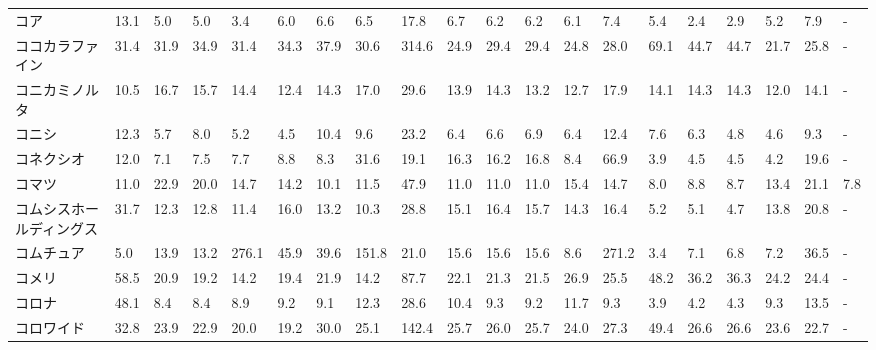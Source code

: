 \begin{longtable}[c]{lp{3mm}p{3mm}p{3mm}p{3mm}p{3mm}p{3mm}p{3mm}p{3mm}p{3mm}p{3mm}p{3mm}p{3mm}p{3mm}p{3mm}p{3mm}p{3mm}p{3mm}p{3mm}p{3mm}}
コア              &   13.1 &    5.0 &       5.0 &       3.4 &        6.0 &     6.6 &     6.5 &     17.8 &     6.7 &     6.2 &    6.2 &    6.1 &     7.4 &     5.4 &     2.4 &    2.9 &    5.2 &     7.9 &      - \\
ココカラファイン        &   31.4 &   31.9 &      34.9 &      31.4 &       34.3 &    37.9 &    30.6 &    314.6 &    24.9 &    29.4 &   29.4 &   24.8 &    28.0 &    69.1 &    44.7 &   44.7 &   21.7 &    25.8 &      - \\
コニカミノルタ         &   10.5 &   16.7 &      15.7 &      14.4 &       12.4 &    14.3 &    17.0 &     29.6 &    13.9 &    14.3 &   13.2 &   12.7 &    17.9 &    14.1 &    14.3 &   14.3 &   12.0 &    14.1 &      - \\
コニシ             &   12.3 &    5.7 &       8.0 &       5.2 &        4.5 &    10.4 &     9.6 &     23.2 &     6.4 &     6.6 &    6.9 &    6.4 &    12.4 &     7.6 &     6.3 &    4.8 &    4.6 &     9.3 &      - \\
コネクシオ           &   12.0 &    7.1 &       7.5 &       7.7 &        8.8 &     8.3 &    31.6 &     19.1 &    16.3 &    16.2 &   16.8 &    8.4 &    66.9 &     3.9 &     4.5 &    4.5 &    4.2 &    19.6 &      - \\
コマツ             &   11.0 &   22.9 &      20.0 &      14.7 &       14.2 &    10.1 &    11.5 &     47.9 &    11.0 &    11.0 &   11.0 &   15.4 &    14.7 &     8.0 &     8.8 &    8.7 &   13.4 &    21.1 &    7.8 \\
コムシスホールディングス    &   31.7 &   12.3 &      12.8 &      11.4 &       16.0 &    13.2 &    10.3 &     28.8 &    15.1 &    16.4 &   15.7 &   14.3 &    16.4 &     5.2 &     5.1 &    4.7 &   13.8 &    20.8 &      - \\
コムチュア           &    5.0 &   13.9 &      13.2 &     276.1 &       45.9 &    39.6 &   151.8 &     21.0 &    15.6 &    15.6 &   15.6 &    8.6 &   271.2 &     3.4 &     7.1 &    6.8 &    7.2 &    36.5 &      - \\
コメリ             &   58.5 &   20.9 &      19.2 &      14.2 &       19.4 &    21.9 &    14.2 &     87.7 &    22.1 &    21.3 &   21.5 &   26.9 &    25.5 &    48.2 &    36.2 &   36.3 &   24.2 &    24.4 &      - \\
コロナ             &   48.1 &    8.4 &       8.4 &       8.9 &        9.2 &     9.1 &    12.3 &     28.6 &    10.4 &     9.3 &    9.2 &   11.7 &     9.3 &     3.9 &     4.2 &    4.3 &    9.3 &    13.5 &      - \\
コロワイド           &   32.8 &   23.9 &      22.9 &      20.0 &       19.2 &    30.0 &    25.1 &    142.4 &    25.7 &    26.0 &   25.7 &   24.0 &    27.3 &    49.4 &    26.6 &   26.6 &   23.6 &    22.7 &      - \\

\end{longtable}
